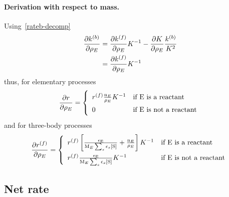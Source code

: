\paragraph{Derivation with respect to mass.}
Using~\ref{rateb-decomp}
\begin{equation}
\begin{split}
\doverdm[E]{\bkwdratecons} & = \doverdm[E]{\fwdratecons}\Eqconst^{-1} - \doverdm[E]{\Eqconst}\frac{\bkwdratecons}{\Eqconst^{2}} \\
                           & = \doverdm[E]{\fwdratecons}\Eqconst^{-1}
\end{split}
\label{rateb-decomp-m}
\end{equation}
thus, for elementary processes
\begin{equation}
\doverdm[E]{\rate} = \left\{\begin{array}{ll}
                        \fwdrate \frac{\scoefabs[E]}{\mass[E]} \Eqconst^{-1} & \text{if \ce{E} is a reactant} \\
                          0                                                  & \text{if \ce{E} is not a reactant} \\
                      \end{array}\right.
\end{equation}
and for three-body processes
\begin{equation}
\renewcommand{\arraystretch}{1.5}
\doverdm[E]{\fwdrate} = \left\{\begin{array}{ll}
                        \fwdrate \left[\frac{\epsilon_{\ce{E}}}{\Mm[E]\threeBody} + \frac{\scoefabs[E]}{\mass[E]} \right] \Eqconst^{-1}
                                                & \text{if \ce{E} is a reactant} \\
                        \fwdrate \frac{\epsilon_{\ce{E}}}{\Mm[E]\threeBody} \Eqconst^{-1}
                                                & \text{if \ce{E} is not a reactant} \\
                      \end{array}\right.
\end{equation}

\subsection{Net rate}

